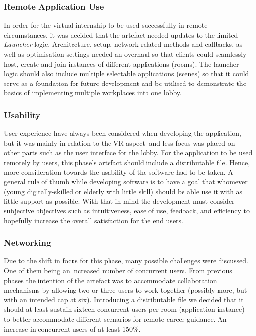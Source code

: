 \subsubsection{Remote Application Use}
In order for the virtual internship to be used successfully in remote circumstances, it was decided that the artefact needed updates to the limited \textit{Launcher} logic. Architecture, setup, network related methods and callbacks, as well as optimisation settings needed an overhaul so that clients could seamlessly host, create and join instances of different applications (rooms). The launcher logic should also include multiple selectable applications (scenes) so that it could serve as a foundation for future development and be utilised to demonstrate the basics of implementing multiple workplaces into one lobby.   

\subsubsection{Usability}
User experience have always been considered when developing the application, but it was mainly in relation to the VR aspect, and less focus was placed on other parts such as the user interface for the lobby. For the application to be used remotely by users, this phase's artefact should include a distributable file. Hence, more consideration towards the usability of the software had to be taken. A general rule of thumb while developing software is to have a goal that whomever (young digitally-skilled or elderly with little skill) should be able use it with as little support as possible. With that in mind the development must consider subjective objectives such as intuitiveness, ease of use, feedback, and efficiency to hopefully increase the overall satisfaction for the end users.



\subsubsection{Networking}
Due to the shift in focus for this phase, many possible challenges were discussed. One of them being an increased number of concurrent users. From previous phases the intention of the artefact was to accommodate collaboration mechanisms by allowing two or three users to work together (possibly more, but with an intended cap at six). Introducing a distributable file we decided that it should at least sustain sixteen concurrent users per room (application instance) to better accommodate different scenarios for remote career guidance. An increase in concurrent users of at least 150\%. 

